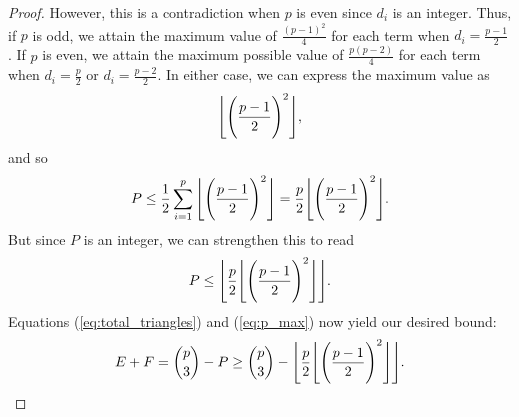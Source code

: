 \documentclass[10pt]{amsart}
\begin{document}
\begin{proof}
    However, this is a contradiction when $p$ is even since $d_i$ is an integer.
    Thus, if $p$ is odd, we attain the maximum value of $\frac{(p - 1)^2}{4}$ for each term when 
    $d_i = \frac{p - 1}{2}$. If $p$ is even, we attain the maximum possible value of 
    $\frac{p(p - 2)}{4}$ for each term when $d_i = \frac{p}{2}$ or $d_i = \frac{p - 2}{2}$.
    In either case, we can express the maximum value as
    $$ \Bigg \lfloor  \Bigg \lparen  \frac{p - 1}{2}  \Bigg \rparen^2  \Bigg \rfloor, $$
    and so
    \begin{equation}
        P \leq \frac{1}{2} \sum^{p}_{i=1}{ \Bigg \lfloor  \Bigg \lparen  \frac{p - 1}{2}  \Bigg \rparen^2  \Bigg \rfloor } 
            = \frac{p}{2} \Bigg \lfloor  \Bigg \lparen  \frac{p - 1}{2}  \Bigg \rparen^2  \Bigg \rfloor. \label{eq:partial_max}
    \end{equation}
    But since $P$ is an integer, we can strengthen this to read
    \begin{equation}
        P \leq \Bigg \lfloor \frac{p}{2} \Bigg \lfloor  \Bigg \lparen  \frac{p - 1}{2}  \Bigg \rparen^2  \Bigg \rfloor \Bigg \rfloor. \label{eq:p_max}
    \end{equation}
    Equations (\ref{eq:total_triangles}) and (\ref{eq:p_max}) now yield our desired bound:
    \begin{equation}
        E + F = \binom{p}{3} - P \geq \binom{p}{3} - \Bigg \lfloor \frac{p}{2} \Bigg \lfloor  \Bigg \lparen  \frac{p - 1}{2}  \Bigg \rparen^2  \Bigg \rfloor \Bigg \rfloor. \label{eq:bound}
    \end{equation}


\end{proof}
\end{document}
